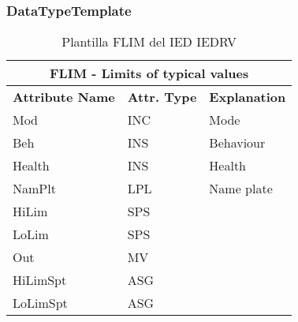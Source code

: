     
    
    \subsubsection{DataTypeTemplate}
    \begin{table}[H]
    \begin{center}
    \begin{tabular}{|l|l|p{8.5cm}|}
            \hline
            \multicolumn{3}{|c|}{\cellcolor[gray]{0.8} \textbf{ FLIM}  - Limits of typical values} \\
            \hline
            \textbf{Attribute Name} & \textbf{Attr. Type} & \textbf{Explanation} \\
            \hline 
            Mod & INC & Mode \\
            \hline
            Beh & INS & Behaviour \\
            \hline
            Health & INS & Health \\
            \hline
            NamPlt & LPL & Name plate \\
            \hline
            HiLim & SPS &   \\
            \hline
            LoLim & SPS &   \\
            \hline
            Out & MV &   \\
            \hline
            HiLimSpt & ASG &   \\
            \hline
            LoLimSpt & ASG &   \\
            \hline
    \end{tabular}
    \caption{Plantilla FLIM del IED IEDRV}
    \label{table:lnTypeFLIM_tipical}
    \end{center}
    \end{table}
    
    
    